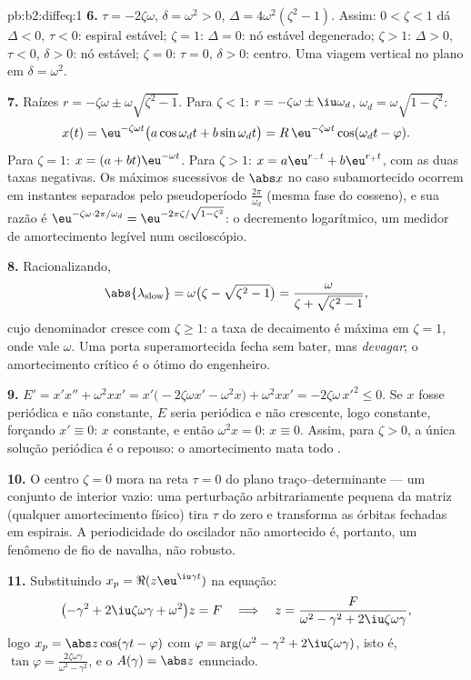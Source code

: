 \begin{solution}{pb:b2:diffeq:1}
\textbf{6.} $\tau = -2\zeta\omega$, $\delta = \omega^2 > 0$,
$\Delta = 4\omega^2(\zeta^2 - 1)$. Assim: $0 < \zeta < 1$ dá
$\Delta < 0$, $\tau < 0$: espiral estável; $\zeta = 1$: $\Delta =
0$: nó estável degenerado; $\zeta > 1$: $\Delta > 0$, $\tau <
0$, $\delta > 0$: nó estável; $\zeta = 0$: $\tau = 0$,
$\delta > 0$: centro. Uma viagem vertical no plano em
$\delta = \omega^2$.

\textbf{7.} Raízes $r = -\zeta\omega \pm
\omega\sqrt{\zeta^2-1}$. Para $\zeta < 1$: $r = -\zeta\omega
\pm \iu\omega_d$, $\omega_d = \omega\sqrt{1-\zeta^2}$:
\[
x(t) = \eu^{-\zeta\omega t}\bigl(a\cos\omega_dt +
b\sin\omega_dt\bigr)
= R\,\eu^{-\zeta\omega t}\cos(\omega_dt - \varphi) .
\]
Para $\zeta = 1$: $x = (a + bt)\eu^{-\omega t}$. Para $\zeta >
1$: $x = a\eu^{r_-t} + b\eu^{r_+t}$, com as duas taxas negativas.
Os máximos sucessivos de $\abs x$ no caso subamortecido ocorrem em
instantes separados pelo pseudoperíodo $\frac{2\pi}{\omega_d}$
(mesma fase do cosseno), e sua razão é
$\eu^{-\zeta\omega\cdot2\pi/\omega_d} =
\eu^{-2\pi\zeta/\sqrt{1-\zeta^2}}$: o decremento logarítmico,
um medidor de amortecimento legível num osciloscópio.

\textbf{8.} Racionalizando,
\[
\abs{\lambda_{\mathrm{slow}}} = \omega\bigl(\zeta -
\sqrt{\zeta^2-1}\bigr)
= \frac{\omega}{\zeta + \sqrt{\zeta^2 - 1}} ,
\]
cujo denominador cresce com $\zeta \geq 1$: a taxa de
decaimento é máxima em $\zeta = 1$, onde vale $\omega$. Uma
porta superamortecida fecha sem bater, mas \emph{devagar};
o amortecimento crítico é o ótimo do engenheiro.

\textbf{9.} $E' = x'x'' + \omega^2xx' =
x'\bigl(-2\zeta\omega x' - \omega^2x\bigr) + \omega^2xx' =
-2\zeta\omega\,x'^2 \leq 0$. Se $x$ fosse periódica e
não constante, $E$ seria periódica e não crescente, logo
constante, forçando $x' \equiv 0$: $x$ constante, e então
$\omega^2x = 0$: $x \equiv 0$. Assim, para $\zeta > 0$, a única
solução periódica é o repouso: o amortecimento mata todo .

\textbf{10.} O centro $\zeta = 0$ mora na reta $\tau =
0$ do plano traço--determinante --- um conjunto de interior
vazio: uma perturbação arbitrariamente pequena da matriz
(qualquer amortecimento físico) tira $\tau$ do zero e transforma as
órbitas fechadas em espirais. A periodicidade do oscilador não
amortecido é, portanto, um fenômeno de fio de navalha, não
robusto.

\textbf{11.} Substituindo $x_p = \Re(z\eu^{\iu\gamma t})$ na
equação:
\[
\bigl(-\gamma^2 + 2\iu\zeta\omega\gamma +
\omega^2\bigr)z = F
\quad\Longrightarrow\quad
z = \frac{F}{\omega^2 - \gamma^2 + 2\iu\zeta\omega\gamma},
\]
logo $x_p = \abs z\cos(\gamma t - \varphi)$ com $\varphi =
\arg(\omega^2 - \gamma^2 + 2\iu\zeta\omega\gamma)$, isto é,
$\tan\varphi = \frac{2\zeta\omega\gamma}{\omega^2 -
\gamma^2}$, e o $A(\gamma) = \abs z$ enunciado.


\end{solution}
